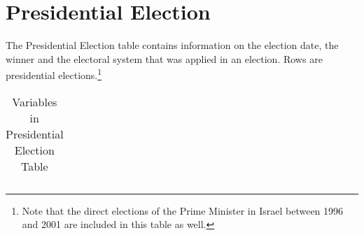 \section{Presidential Election}\label{sec_presidential_election}
The Presidential Election table contains information on the election date, the winner and the electoral system that was applied in an election. 
Rows are presidential elections.\footnote{Note that the direct elections of the Prime Minister in Israel between 1996 and 2001 are included in this table as well.}


\begin{center}
\begin{longtable}{L{4cm} L{6cm} L{3cm}}
\caption{Variables in Presidential Election Table\label{tab_presidential_election}}


\end{longtable}
\end{center}
